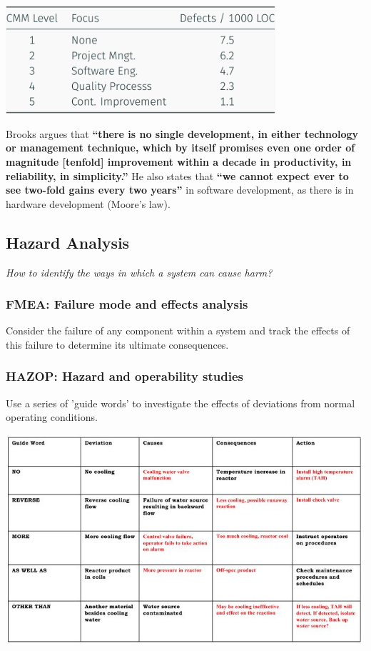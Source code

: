 \documentclass[
  10pt,
  a4paper,
]{article}
\begin{document}
\begin{multicols*}{2}
\begin{center}
\includegraphics[width=\textwidth,height=4cm]{images/safety/image-31.png}
\end{center}

Brooks argues that \textbf{``there is no single development, in either
technology or management technique, which by itself promises even one
order of magnitude {[}tenfold{]} improvement within a decade in
productivity, in reliability, in simplicity.''} He also states that
\textbf{``we cannot expect ever to see two-fold gains every two years''}
in software development, as there is in hardware development (Moore's
law).

\subsection{Hazard Analysis}\label{hazard-analysis}

\vspace{-2mm}{\color{Orchid}\faQuestionCircle[regular]} \emph{How to
identify the ways in which a system can cause harm?}

\subsubsection{FMEA: Failure mode and effects
analysis}\label{fmea-failure-mode-and-effects-analysis}

Consider the failure of any component within a system and track the
effects of this failure to determine its ultimate consequences.

\subsubsection{HAZOP: Hazard and operability
studies}\label{hazop-hazard-and-operability-studies}

Use a series of 'guide words' to investigate the effects of deviations
from normal operating conditions.

\includegraphics{images/safety/image.png}


\end{multicols*}
\end{document}
